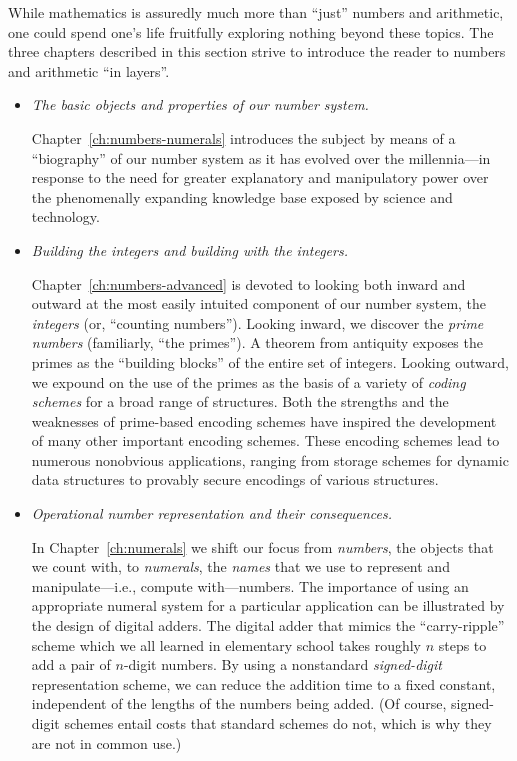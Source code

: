 
While mathematics is assuredly much more than ``just'' numbers and arithmetic, one could spend one's life fruitfully exploring nothing beyond these topics.  The three chapters described in this
section strive to introduce the reader to numbers and arithmetic ``in layers''.
\begin{itemize}
\item
{\em The basic objects and properties of our number system.}

\smallskip

Chapter~\ref{ch:numbers-numerals} introduces the subject by means of a ``biography'' of our number system as it has evolved over the millennia---in response to the need for greater explanatory and manipulatory power over the phenomenally expanding knowledge base exposed by science and technology.
\item
{\em Building the integers and building with the integers.}

\smallskip

Chapter~\ref{ch:numbers-advanced} is devoted to looking both inward and outward at the most easily intuited component of our number system, the {\em integers} (or, ``counting numbers'').  Looking inward, we discover the {\em prime numbers} (familiarly, ``the primes'').  A theorem from antiquity exposes the primes as the ``building blocks'' of the entire set of integers.  Looking outward, we expound on the use of the primes as the basis of a variety of {\em coding schemes} for a broad range of structures.  Both the strengths and the weaknesses of prime-based encoding schemes have inspired the development of many other important encoding schemes.  These encoding schemes lead to numerous nonobvious applications, ranging from storage schemes for dynamic data structures to provably secure encodings of various structures.

\item
{\em Operational number representation and their consequences.}

\smallskip

In Chapter~\ref{ch:numerals} we shift our focus from {\em numbers}, the objects that we count with, to {\em numerals}, the {\em names} that we use to represent and manipulate---i.e., compute with---numbers.  The importance of using an appropriate numeral system for a particular application can be illustrated by the design of digital adders.  The digital adder that mimics the ``carry-ripple'' scheme which we all learned in elementary school takes roughly $n$ steps to add a pair of $n$-digit numbers.  By using a nonstandard {\em signed-digit} representation scheme, we can reduce the addition time to a fixed constant, independent of the lengths of the numbers being added.  (Of course, signed-digit schemes entail costs that standard schemes do not, which
is why they are not in common use.)
\end{itemize}
